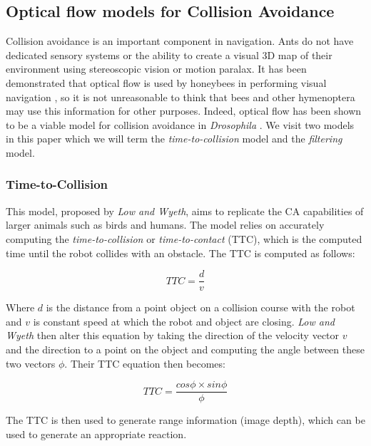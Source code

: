 \documentclass[a4paper,12pt]{article}
\begin{document}
\subsection{ Optical flow models for Collision Avoidance } \label{sec:ofca}
Collision avoidance is an important component in navigation. Ants
do not have dedicated sensory systems or the ability to create a visual 3D map of their environment
using stereoscopic vision or motion paralax. It has been demonstrated that optical flow is used by
honeybees in performing visual navigation \cite{Dittmar2010}, so it is not unreasonable to
think that bees and other hymenoptera may use this information for other purposes. Indeed, optical
flow has been shown to be a viable model for collision avoidance in \textit{Drosophila}
\cite{Stewart2010}. We visit two models in this paper which we will term the
\textit{time-to-collision} model and the \textit{filtering} model.

\subsubsection{ Time-to-Collision }
This model, proposed by \textit{Low and Wyeth}\cite{Low2005}, aims to replicate the CA capabilities
of larger animals such as birds and humans. The model relies on accurately computing the
\textit{time-to-collision} or \textit{time-to-contact} (TTC), which is the computed time until the
robot collides with an obstacle. The TTC is computed as follows:

\begin{equation}
  \label{eqn:lowttc}
TTC = \frac{d}{v}
\end{equation}

Where $d$ is the distance from a point object on a collision course with the robot and $v$ is
constant speed at which the robot and object are closing.
\newline
\textit{Low and Wyeth} then alter this equation by taking the direction of the velocity vector $v$
and the direction to a point on the object and computing the angle between these two vectors $\phi$.
Their TTC equation then becomes:

\begin{equation}
 TTC = \frac{cos\phi \times sin\phi}{\phi}
\end{equation}

The TTC is then used to generate range information (image depth), which can be used to generate an
appropriate reaction.
\newline
\end{document}
